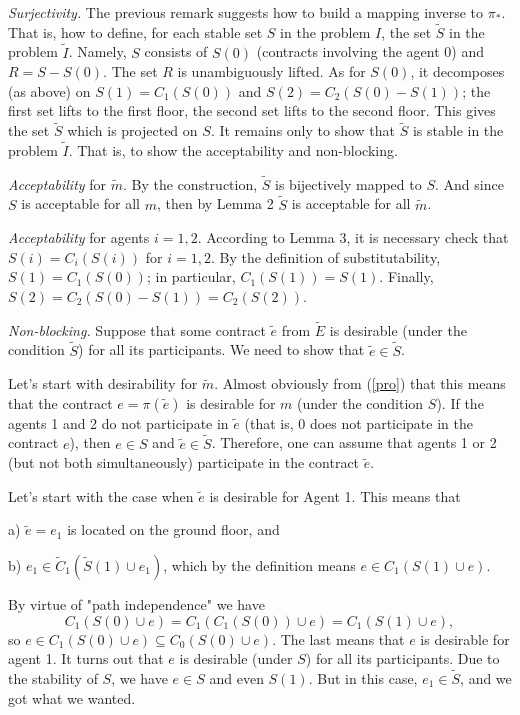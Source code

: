 \documentclass[12pt,a4paper]{article}
\begin{document}
\emph{Surjectivity.} The previous remark suggests how to build a mapping  inverse to $\pi_*$. That is, how to define, for each stable set $S$ in the problem $I$, the set $\widetilde S$ in the problem $\widetilde I$. Namely, $S$ consists of $S(0)$ (contracts involving the agent 0) and $R=S-S(0)$. The set $R$ is unambiguously lifted. As for $S(0)$, it decomposes (as above) on $S(1)=C_1(S(0))$ and $S(2)=C_2(S(0)-S(1))$; the first set lifts to the first floor, the second set lifts to the second floor. This gives the set $\widetilde S$ which is projected on $S$. It remains only to show that $\widetilde S$ is stable in the problem $\widetilde I$. That is, to show the acceptability and non-blocking.\medskip

\emph{Acceptability} for $\widetilde m$. By the construction, $\widetilde S$ is bijectively mapped to $S$. And since $S$ is acceptable for all $m$, then by Lemma 2 $\widetilde S$ is acceptable for all $\widetilde m$.

\emph{Acceptability} for agents $i=1, 2$. According to Lemma 3, it is necessary check that $S(i)=C_i(S(i))$ for $i=1,2$. By the definition of substitutability, $S(1)= C_1(S(0))$; in particular, $C_1(S(1))=S(1)$. Finally, $S(2)=C_2(S(0)-S(1))=C_2(S(2))$.

\emph{Non-blocking.} Suppose that some contract $\widetilde e$ from $\widetilde E$ is desirable (under the condition $\widetilde S$) for all its participants. We need to show that $\widetilde e \in \widetilde S$.

Let's start with desirability for $\widetilde m$. Almost obviously from (\ref{pro}) that this means that the contract $e=\pi (\widetilde e)$ is desirable for $m$ (under the condition $S$). If the agents 1 and 2 do not  participate in  $\widetilde e$ (that is, 0 does not participate in the contract $e$), then $e\in S$ and $\widetilde e\in \widetilde S$. Therefore, one can assume that agents 1 or 2 (but not both simultaneously) participate in the contract $\widetilde e$.

Let's start with the case when $\widetilde e$ is desirable for Agent 1. This means that

a) $\widetilde e=e_1$ is located on the ground floor, and

b) $e_1\in \widetilde C_1(\widetilde S(1)\cup e_1)$, which by the definition means $e\in C_1(S(1)\cup e)$.

\noindent By virtue of "path independence" we have
                                                 $$
C_1(S(0)\cup e)=C_1(C_1(S(0))\cup  e)=C_1(S(1)\cup e),
                                                   $$
so $e\in C_1(S(0)\cup e)\subseteq C_0(S(0)\cup e)$. The last means that $e$ is desirable for agent 1. It turns out that $e$ is desirable (under $S$) for all its participants. Due to the stability of $S$, we have $e\in S$ and even $S(1)$. But in this case, $e_1\in\widetilde S$, and we got what we wanted.
\end{document}
